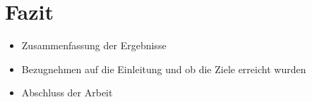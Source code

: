 \section{Fazit}
\label{sec/fazit}

\begin{itemize}
	\item Zusammenfassung der Ergebnisse
	\item Bezugnehmen auf die Einleitung und ob die Ziele erreicht wurden
	\item Abschluss der Arbeit
\end{itemize}
